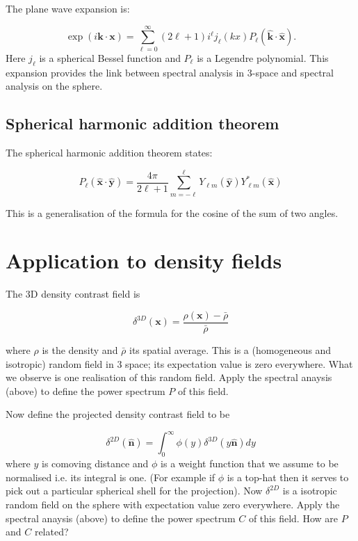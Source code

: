 \documentclass[11pt]{article}
\begin{document}
The plane wave expansion is:

\begin{equation}
\exp(i \boldsymbol{k} \cdot \boldsymbol{x}) = \sum_{\ell=0}^\infty (2 \ell +1) i^{\ell} j_{\ell}(kx) P_{\ell}(\boldsymbol{\hat{k}} \cdot \boldsymbol{\hat{x}}).
\end{equation}
Here $j_{\ell}$ is a spherical Bessel function and $P_{\ell}$ is a Legendre polynomial. This expansion provides the link between spectral analysis in 3-space and spectral analysis on the sphere.

\subsection{Spherical harmonic addition theorem}

The spherical harmonic addition theorem states:

\begin{equation}
P_{\ell}(\boldsymbol{\hat{x}} \cdot \boldsymbol{\hat{y}}) = \frac{4 \pi}{2 \ell + 1}\sum_{m=-\ell}^{\ell} Y_{\ell m}(\boldsymbol{\hat{y}}) Y_{\ell m}^{\ast}(\boldsymbol{\hat{x}})
\end{equation}

\noindent This is a generalisation of the formula for the cosine of the sum of two angles.

\section{Application to density fields}

The 3D density contrast field is

\begin{equation}
\delta^{3D}(\boldsymbol{x}) = \frac{\rho(\boldsymbol{x}) - \bar{\rho}}{\bar{\rho}}
\end{equation}

\noindent where $\rho$ is the density and $\bar{\rho}$ its spatial average. This is a (homogeneous and isotropic) random field in 3 space; its expectation value is zero everywhere. What we observe is one realisation of this random field. Apply the spectral anaysis (above) to define the power spectrum $P$ of this field.

Now define the projected density contrast field to be

\begin{equation}
\delta^{2D}(\boldsymbol{\hat{n}}) = \int_0^{\infty} \phi(y) \delta^{3D}(y \boldsymbol{\hat{n}}) dy
\end{equation}
where $y$ is comoving distance and $\phi$ is a weight function that we assume to be normalised i.e. its integral is one. (For example if $\phi$ is a top-hat then it serves to pick out a particular spherical shell for the projection). Now $\delta^{2D}$ is a isotropic random field on the sphere with expectation value zero everywhere. Apply the spectral anaysis (above) to define the power spectrum $C$ of this field. How are $P$ and $C$ related?
\end{document}
